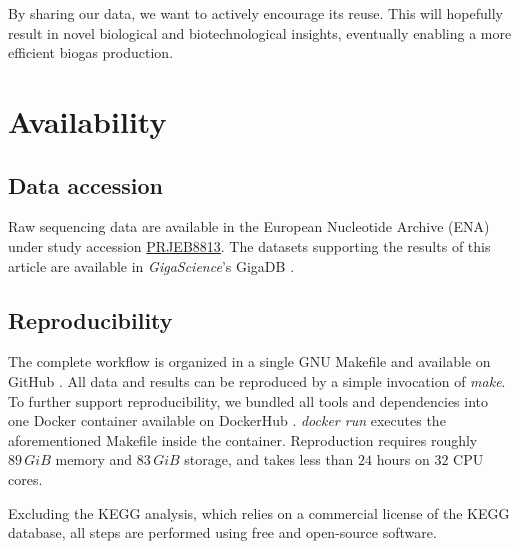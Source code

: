\documentclass{bmcart}
\begin{document}
By sharing our data, we want to actively encourage its reuse. This will hopefully result in novel biological and biotechnological insights, eventually enabling a more efficient biogas production.

\section*{Availability}

\subsection*{Data accession}
Raw sequencing data are available in the European Nucleotide Archive (ENA) under study accession \href{http://www.ebi.ac.uk/ena/data/view/PRJEB8813}{PRJEB8813}. The datasets supporting the results of this article are available in \emph{GigaScience}'s GigaDB \cite{GigaDB}.

\subsection*{Reproducibility}
The complete workflow is organized in a single GNU Makefile and available on GitHub \cite{GitHub}.
All data and results can be reproduced by a simple invocation of \emph{make}.
To further support reproducibility, we bundled all tools and dependencies into one Docker container available on DockerHub \cite{DockerHub}. \emph{docker run} executes the aforementioned Makefile inside the container.
Reproduction requires roughly $89\,GiB$ memory and $83\,GiB$ storage, and takes less than $24$ hours on $32$ CPU cores.

Excluding the KEGG analysis, which relies on a commercial license of the KEGG database, all steps are performed using free and open-source software.

\end{document}
